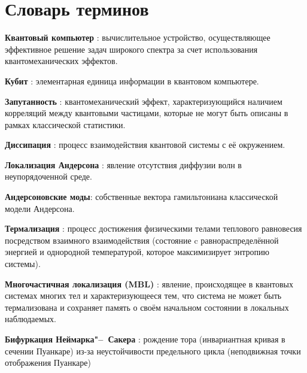 \chapter*{Словарь терминов}             %

\textbf{Квантовый компьютер} : вычислительное устройство, осуществляющее эффективное решение задач широкого спектра за счет использования квантомеханических эффектов.

\textbf{Кубит} : элементарная единица информации в квантовом компьютере.

\textbf{Запутанность} : квантомеханический эффект, характеризующийся наличием корреляций между квантовыми частицами, которые не могут быть описаны в рамках классической статистики.

\textbf{Диссипация} : процесс взаимодействия квантовой системы с её окружением.

\textbf{Локализация Андерсона} : явление отсутствия диффузии волн в неупорядоченной среде.

\textbf{Андерсоновские моды}: собственные вектора гамильтониана классической модели Андерсона. 

\textbf{Термализация} : процесс достижения физическими телами теплового равновесия посредством взаимного взаимодействия (состояние c равнораспределённой энергией и однородной температурой, которое максимизирует энтропию системы). 

\textbf{Многочастичная локализация (MBL)} : явление, происходящее в квантовых системах многих тел и характеризующееся тем, что система не может быть термализована и сохраняет память о своём начальном состоянии в локальных наблюдаемых.

\textbf{Бифуркация Неймарка"--~Сакера} : рождение тора (инвариантная кривая в сечении Пуанкаре) из-за неустойчивости предельного цикла (неподвижная точки отображения Пуанкаре)


